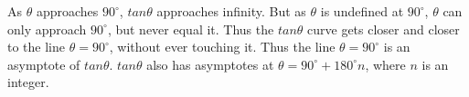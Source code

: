           
        
        \label{m39414*uid89}
            \nopagebreak
            
          
          \label{m39414*id91637}As \begin{math}\theta \end{math} approaches \begin{math}{90}^{\circ }\end{math}, \begin{math}tan\theta \end{math} approaches infinity. But as \begin{math}\theta \end{math} is undefined at \begin{math}{90}^{\circ }\end{math}, \begin{math}\theta \end{math} can only approach \begin{math}{90}^{\circ }\end{math}, but never equal it. Thus the \begin{math}tan\theta \end{math} curve gets closer and closer to the line \begin{math}\theta ={90}^{\circ }\end{math}, without ever touching it. Thus the line \begin{math}\theta ={90}^{\circ }\end{math} is an asymptote of \begin{math}tan\theta \end{math}. \begin{math}tan\theta \end{math} also has asymptotes at \begin{math}\theta ={90}^{\circ }+{180}^{\circ }n\end{math}, where \begin{math}n\end{math} is an integer.\par 
\label{m39414*secfhsst!!!underscore!!!id3393}
            \nopagebreak
            
